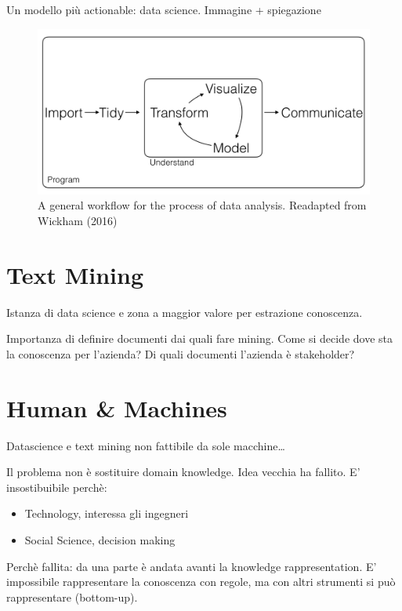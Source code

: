 \documentclass[]{book}
\providecommand{\tightlist}{%
  \setlength{\itemsep}{0pt}\setlength{\parskip}{0pt}}
\begin{document}
Un modello più actionable: data science. Immagine + spiegazione

\begin{figure}

{\centering \includegraphics[width=0.8\linewidth]{_bookdown_files/figures/main_work_flow} 

}

\caption{A general workflow for the process of data analysis. Readapted from Wickham (2016)}\label{fig:mainworkflow}
\end{figure}

\section{Text Mining}\label{text-mining}

Istanza di data science e zona a maggior valore per estrazione
conoscenza.

Importanza di definire documenti dai quali fare mining. Come si decide
dove sta la conoscenza per l'azienda? Di quali documenti l'azienda è
stakeholder?

\section{Human \& Machines}\label{human-machines}

Datascience e text mining non fattibile da sole macchine\ldots{}

Il problema non è sostituire domain knowledge. Idea vecchia ha fallito.
E' insostibuibile perchè:

\begin{itemize}
\tightlist
\item
  Technology, interessa gli ingegneri
\item
  Social Science, decision making
\end{itemize}

Perchè fallita: da una parte è andata avanti la knowledge
rappresentation. E' impossibile rappresentare la conoscenza con regole,
ma con altri strumenti si può rappresentare (bottom-up).
\end{document}
